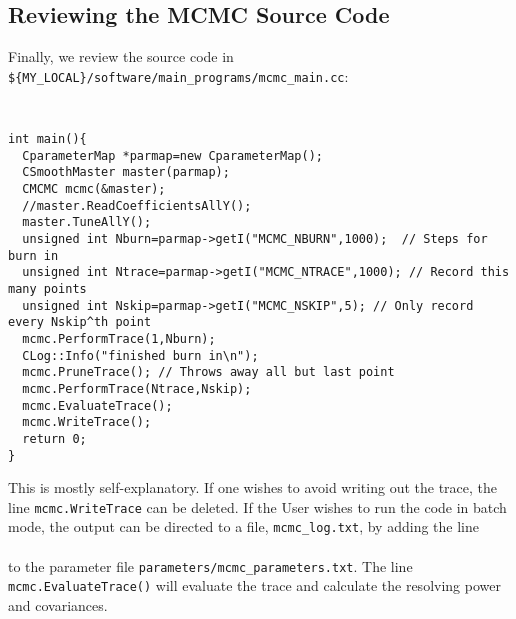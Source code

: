 \documentclass[UserManual.tex]{subfiles}
\begin{document}
\subsection{Reviewing the MCMC Source Code}\label{sec:mcmcsource}

Finally, we review the source code in {\tt \$\{MY\_LOCAL\}/software/main\_programs/mcmc\_main.cc}:
{\tt
\begin{verbatim}
int main(){
  CparameterMap *parmap=new CparameterMap();
  CSmoothMaster master(parmap);
  CMCMC mcmc(&master);
  //master.ReadCoefficientsAllY();
  master.TuneAllY();
  unsigned int Nburn=parmap->getI("MCMC_NBURN",1000);  // Steps for burn in
  unsigned int Ntrace=parmap->getI("MCMC_NTRACE",1000); // Record this many points
  unsigned int Nskip=parmap->getI("MCMC_NSKIP",5); // Only record every Nskip^th point  
  mcmc.PerformTrace(1,Nburn);  
  CLog::Info("finished burn in\n");
  mcmc.PruneTrace(); // Throws away all but last point
  mcmc.PerformTrace(Ntrace,Nskip);
  mcmc.EvaluateTrace();
  mcmc.WriteTrace();
  return 0;
}
\end{verbatim}}
This is mostly self-explanatory. If one wishes to avoid writing out the trace, the line {\tt mcmc.WriteTrace} can be deleted. If the User wishes to run the code in batch mode, the output can be directed to a file, {\tt mcmc\_log.txt}, by adding the line\\
\hspace*{20pt}{\tt LogFileName mcmc\_log.txt} \\
to the parameter file {\tt parameters/mcmc\_parameters.txt}. The line {\tt mcmc.EvaluateTrace()} will evaluate the trace and calculate the resolving power and covariances.
\end{document}
